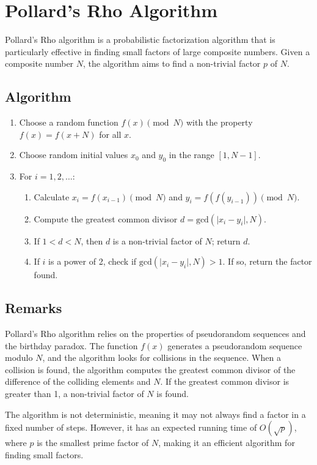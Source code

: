 \documentclass[12pt,openany]{book}
\theoremstyle{definition}
\begin{document}
	\section*{Pollard's Rho Algorithm}
	
	Pollard's Rho algorithm is a probabilistic factorization algorithm that is particularly effective in finding small factors of large composite numbers. Given a composite number $N$, the algorithm aims to find a non-trivial factor $p$ of $N$.
	
	\subsection*{Algorithm}
	
	\begin{enumerate}
		\item Choose a random function $f(x) \pmod{N}$ with the property $f(x) = f(x + N)$ for all $x$.
		\item Choose random initial values $x_0$ and $y_0$ in the range $[1, N-1]$.
		\item For $i = 1, 2, \ldots$:
		\begin{enumerate}
			\item Calculate $x_i = f(x_{i-1}) \pmod{N}$ and $y_i = f(f(y_{i-1})) \pmod{N}$.
			\item Compute the greatest common divisor $d = \text{gcd}(\lvert x_i - y_i \rvert, N)$.
			\item If $1 < d < N$, then $d$ is a non-trivial factor of $N$; return $d$.
			\item If $i$ is a power of 2, check if $\text{gcd}(\lvert x_i - y_i \rvert, N) > 1$. If so, return the factor found.
		\end{enumerate}
	\end{enumerate}
	
	\subsection*{Remarks}
	
	Pollard's Rho algorithm relies on the properties of pseudorandom sequences and the birthday paradox. The function $f(x)$ generates a pseudorandom sequence modulo $N$, and the algorithm looks for collisions in the sequence. When a collision is found, the algorithm computes the greatest common divisor of the difference of the colliding elements and $N$. If the greatest common divisor is greater than 1, a non-trivial factor of $N$ is found.
	
	The algorithm is not deterministic, meaning it may not always find a factor in a fixed number of steps. However, it has an expected running time of $O(\sqrt{p})$, where $p$ is the smallest prime factor of $N$, making it an efficient algorithm for finding small factors.
	
\end{document}
